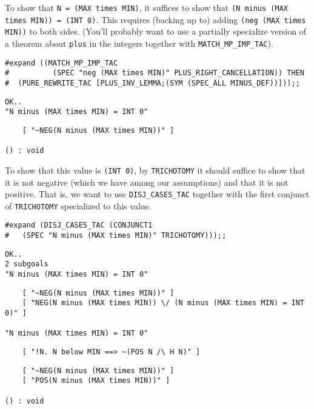 To show that {\small\verb+N = (MAX times MIN)+}, it suffices to show
that {\small\verb+(N minus (MAX times MIN)) = (INT 0)+}.  This
requires (backing up to) adding {\small\verb+(neg (MAX times MIN))+}
to both sides.  (You'll probably want to use a partially specialize
version of a theorem about {\small\verb+plus+} in the integers
together with {\small\verb+MATCH_MP_IMP_TAC+}). 
\begin{session}
\begin{verbatim}
#expand ((MATCH_MP_IMP_TAC
#          (SPEC "neg (MAX times MIN)" PLUS_RIGHT_CANCELLATION)) THEN
#  (PURE_REWRITE_TAC [PLUS_INV_LEMMA;(SYM (SPEC_ALL MINUS_DEF))]));;
\end{verbatim}
\mvdots
\begin{verbatim}
OK..
"N minus (MAX times MIN) = INT 0"
\end{verbatim}
\mvdots
\begin{verbatim}
    [ "~NEG(N minus (MAX times MIN))" ]

() : void
\end{verbatim}
\end{session}

To show that this value is {\small\verb+(INT 0)+}, by
{\small\verb+TRICHOTOMY+} it should suffice to show that it is not
negative (which we have among our assumptions) and that it is not
positive.  That is, we want to use {\small\verb+DISJ_CASES_TAC+}
together with the first conjunct of {\small\verb+TRICHOTOMY+}
specialized to this value. 
\begin{session}
\begin{verbatim}
#expand (DISJ_CASES_TAC (CONJUNCT1
#   (SPEC "N minus (MAX times MIN)" TRICHOTOMY)));;
\end{verbatim}
\mvdots
\begin{verbatim}
OK..
2 subgoals
"N minus (MAX times MIN) = INT 0"
\end{verbatim}
\mvdots
\begin{verbatim}
    [ "~NEG(N minus (MAX times MIN))" ]
    [ "NEG(N minus (MAX times MIN)) \/ (N minus (MAX times MIN) = INT 0)" ]

"N minus (MAX times MIN) = INT 0"
\end{verbatim}
\mvdots
\begin{verbatim}
    [ "!N. N below MIN ==> ~(POS N /\ H N)" ]
\end{verbatim}
\mvdots
\begin{verbatim}
    [ "~NEG(N minus (MAX times MIN))" ]
    [ "POS(N minus (MAX times MIN))" ]

() : void
\end{verbatim}
\end{session}

